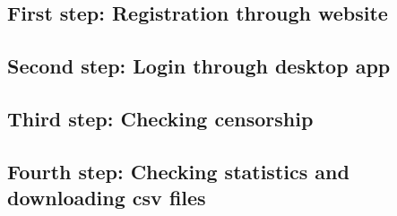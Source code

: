 \documentclass[12pt]{article}
\begin{document}
\subsection{First step: Registration through website}



\subsection{Second step: Login through desktop app}



\subsection{Third step: Checking censorship}


\subsection{Fourth step: Checking statistics and downloading csv files}

\end{document}
